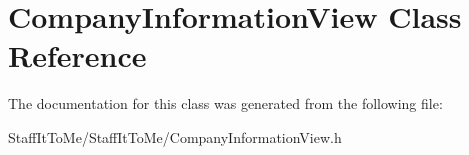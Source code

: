 \hypertarget{interface_company_information_view}{
\section{\-Company\-Information\-View \-Class \-Reference}
\label{interface_company_information_view}
}


\-The documentation for this class was generated from the following file\-:\begin{DoxyCompactItemize}
\item 
\-Staff\-It\-To\-Me/\-Staff\-It\-To\-Me/\-Company\-Information\-View.\-h\end{DoxyCompactItemize}
